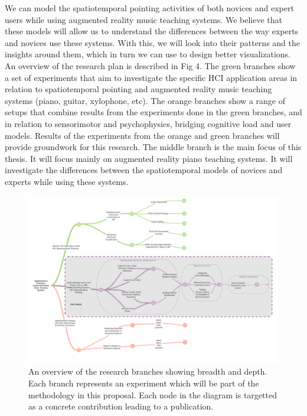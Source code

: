 \documentclass[manuscript,screen]{acmart}
\begin{document}
We can model the spatiotemporal pointing activities of both novices and expert users while using augmented reality music teaching systems. We believe that these models will allow us to understand the differences between the way experts and novices use these systems. With this, we will look into their patterns and the insights around them, which in turn we can use to design better visualizations. An overview of the research plan is described in Fig 4. The green branches show a set of experiments that aim to investigate the specific HCI application areas in relation to spatiotemporal pointing and augmented reality music teaching systems (piano, guitar, xylophone, etc). The orange branches show a range of setups that combine results from the experiments done in the green branches, and in relation to sensorimotor and psychophysics, bridging cognitive load and user models. Results of the experiments from the orange and green branches will provide groundwork for this research. The middle branch is the main focus of this thesis. It will focus mainly on augmented reality piano teaching systems. It will investigate the differences between the spatiotemporal models of novices and experts while using these systems. \\
\begin{landscape}
\begin{figure}[h]
\centering
 \includegraphics[width=\columnwidth\textheight]{figures/branches.png}
    \caption{An overview of the research branches showing breadth and depth. Each branch represents an experiment which will be part of the methodology in this proposal. Each node in the diagram is targetted  as a concrete contribution leading to a publication.
 }\label{fig:branches}
\end{figure}
\end{landscape}
\end{document}
